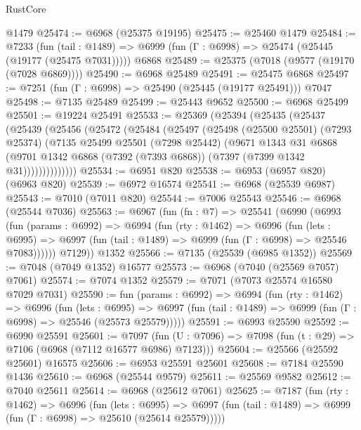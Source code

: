 \begin{lexlean}{RustCore}
\begin{coremodule}
    @1479
@25474 := @6968 (@25375 @19195)
@25475 := @25460 @1479
@25484 := @7233
    (fun (tail : @1489) => @6999 (fun (Γ : @6998) => @25474 (@25445 (@19177 (@25475 @7031)))))
    @6868
@25489 := @25375 (@7018 (@9577 (@19170 (@7028 @6869))))
@25490 := @6968 @25489
@25491 := @25475 @6868
@25497 := @7251 (fun (Γ : @6998) => @25490 (@25445 (@19177 @25491))) @7047
@25498 := @7135 @25489
@25499 := @25443 @9652
@25500 := @6968 @25499
@25501 := @19224 @25491
@25533 := @25369
    (@25394
      (@25435
        (@25437
          (@25439
            (@25456
              (@25472
                (@25484
                  (@25497
                    (@25498
                      (@25500 @25501)
                      (@7293 @25374)
                      (@7135
                        @25499
                        @25501
                        (@7298 @25442)
                        (@9671
                          @1343
                          @31
                          @6868
                          (@9701
                            @1342
                            @6868
                            (@7392 (@7393 @6868))
                            (@7397 (@7399 @1342 @31))))))))))))))
@25534 := @6951 @820
@25538 := @6953 (@6957 @820) (@6963 @820)
@25539 := @6972 @16574
@25541 := @6968 (@25539 @6987)
@25543 := @7010 (@7011 @820)
@25544 := @7006 @25543
@25546 := @6968 (@25544 @7036)
@25563 := @6967
    (fun (fn : @7) =>
    @25541
      (@6990
        (@6993
          (fun (params : @6992) =>
          @6994
            (fun (rty : @1462) =>
            @6996
              (fun (lets : @6995) =>
              @6997 (fun (tail : @1489) => @6999 (fun (Γ : @6998) => @25546 @7083))))))
        @7129))
    @1352
@25566 := @7135 (@25539 (@6985 @1352))
@25569 := @7048 (@7049 @1352) @16577
@25573 := @6968 (@7040 (@25569 @7057) @7061)
@25574 := @7074 @1352
@25579 := @7071 (@7073 @25574 @16580 @7029 @7031)
@25590 := fun (params : @6992) =>
  @6994
    (fun (rty : @1462) =>
    @6996
      (fun (lets : @6995) =>
      @6997 (fun (tail : @1489) => @6999 (fun (Γ : @6998) => @25546 (@25573 @25579)))))
@25591 := @6993 @25590
@25592 := @6990 @25591
@25601 := @7097
    (fun (U : @7096) => @7098 (fun (t : @29) => @7106 (@6968 (@7112 @16577 @6986) @7123)))
@25604 := @25566 (@25592 @25601) @16575
@25606 := @6953 @25591 @25601
@25608 := @7184 @25590 @1436
@25610 := @6968 (@25544 @9579)
@25611 := @25569 @9582
@25612 := @7040 @25611
@25614 := @6968 (@25612 @7061)
@25625 := @7187
    (fun (rty : @1462) =>
    @6996
      (fun (lets : @6995) =>
      @6997 (fun (tail : @1489) => @6999 (fun (Γ : @6998) => @25610 (@25614 @25579)))))

\end{coremodule}
\end{lexlean}
